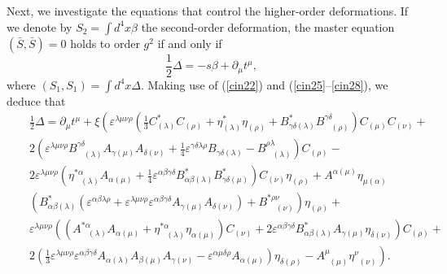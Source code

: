 \documentclass[a4paper,12pt]{article}
\begin{document}
Next, we investigate the equations that control the higher-order
deformations. If we denote by $S_{2}=\int d^{4}x\beta $ the second-order
deformation, the master equation $\left( \bar{S},\bar{S}\right) =0$ holds to
order $g^{2}$ if and only if
\begin{equation}
\frac{1}{2}\Delta =-s\beta +\partial _{\mu }t^{\mu },  \label{cin28a}
\end{equation}
where $\left( S_{1},S_{1}\right) =\int d^{4}x\Delta $. Making use
of (\ref {cin22}) and (\ref{cin25}--\ref{cin28}), we deduce that
\begin{eqnarray}
&&\frac{1}{2}\Delta =\partial _{\mu }t^{\mu }+\xi \left(
\varepsilon ^{\lambda \mu \nu \rho }\left( \frac{1}{3}C_{(\lambda
)}^{*}C_{(\rho )}+\eta _{(\lambda )}^{*}\eta _{(\rho )}+B_{\gamma
\delta (\lambda )}^{*}B_{\;\;\;(\rho )}^{\gamma \delta }\right)
C_{(\mu )}C_{(\nu )}+\right. \nonumber \\
&&2\left( \varepsilon ^{\lambda \mu \nu \rho }B_{\;\;\;(\lambda
)}^{\gamma \delta }A_{\gamma (\mu )}A_{\delta (\nu
)}+\frac{1}{4}\varepsilon ^{\gamma \delta \lambda \rho }B_{\gamma
\delta (\lambda )}-B_{\;\;\;(\lambda )}^{\rho \lambda }\right)
C_{(\rho )}- \nonumber \\
&&2\varepsilon ^{\lambda \mu \nu \rho }\left( \eta
_{\;\;\;(\lambda )}^{*\alpha }A_{\alpha (\mu
)}+\frac{1}{4}\varepsilon ^{\alpha \beta \gamma \delta }B_{\alpha
\beta (\lambda )}^{*}B_{\gamma \delta (\mu )}^{*}\right) C_{(\nu
)}\eta _{(\rho )}+A^{\alpha (\mu )}\eta _{\mu (\alpha )} \nonumber
\\
&&\left( B_{\alpha \beta (\lambda )}^{*}\left( \varepsilon
^{\alpha \beta \lambda \rho }+\varepsilon ^{\lambda \mu \nu \rho
}\varepsilon ^{\alpha \beta \gamma \delta }A_{\gamma (\mu
)}A_{\delta (\nu )}\right) +B_{\;\;\;\;(\nu )}^{*\rho \nu }\right)
\eta _{(\rho )}+ \nonumber \\
&&\varepsilon ^{\lambda \mu \nu \rho }\left( \left(
A_{\;\;\;(\lambda )}^{*\alpha }A_{\alpha (\mu )}+\eta
_{\;\;\;(\lambda )}^{*\alpha }\eta _{\alpha (\mu )}\right) C_{(\nu
)}+2\varepsilon ^{\alpha \beta \gamma \delta }B_{\alpha \beta
(\lambda )}^{*}A_{\gamma (\mu )}\eta _{\delta (\nu )}\right)
C_{(\rho )}+ \nonumber \\
&&\left. 2\left( \frac{1}{3}\varepsilon ^{\lambda \mu \nu \rho
}\varepsilon ^{\alpha \beta \gamma \delta }A_{\alpha (\lambda
)}A_{\beta (\mu )}A_{\gamma (\nu )}-\varepsilon ^{\alpha \mu
\delta \rho }A_{\alpha (\mu )}\right) \eta _{\delta (\rho
)}-A_{\;\;(\mu )}^{\mu }\eta _{\;\;(\nu )}^{\nu }\right) .
\label{cin29}
\end{eqnarray}
\end{document}
